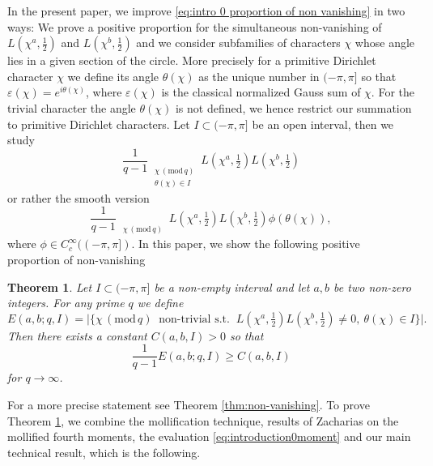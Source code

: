 \documentclass[12pt]{amsart}
\theoremstyle{plain}
\newtheorem{thm}{Theorem}[section]
\theoremstyle{definition}
\theoremstyle{remark}
\numberwithin{equation}{section}
\newcommand\sumst{\mathop{{\sum}^\ast}\limits}
\newcommand{\mods}[1]{\,(\mathrm{mod}\,{#1})}
\renewcommand{\geq}{\geqslant}
\begin{document}
In the present paper, we improve \eqref{eq:intro 0 proportion of non vanishing} in two ways: We prove a positive proportion for the simultaneous non-vanishing of $L(\chi^a,\tfrac{1}{2})$ and $L(\chi^b,\tfrac{1}{2})$ and we consider subfamilies of characters $\chi$ whose angle lies in a given section of the circle. More precisely for a primitive Dirichlet character $\chi$ we define its angle $\theta(\chi)$ as the unique number in $(-\pi,\pi]$ so that $\varepsilon(\chi) = e^{i\theta(\chi)}$, where $\varepsilon(\chi)$ is the classical normalized Gauss sum of $\chi$. For the trivial character the angle $\theta (\chi)$ is not defined, we hence restrict our summation to primitive Dirichlet characters. Let $I \subset (-\pi,\pi]$ be an open interval, then we study
\begin{equation*}
    \frac{1}{q-1}\sumst_{\substack{\chi \mods{q}\\ \theta(\chi) \in I}}L\left(\chi^a,\tfrac{1}{2}\right)L\left(\chi^b,\tfrac{1}{2}\right)
\end{equation*}
or rather the smooth version 
\begin{equation*}
    \frac{1}{q-1}\sumst_{\substack{\chi \mods{q}}}L\left(\chi^a,\tfrac 12\right)L\left(\chi^b,\tfrac 12\right)\phi(\theta(\chi)),
\end{equation*}
where $\phi \in C_c^{\infty}((-\pi,\pi]).$  
In this paper, we show the following positive proportion of non-vanishing 
\begin{thm}\label{thm:intro nonvanishing}Let $I \subset (-\pi,\pi]$ be a non-empty interval and let $a,b$ be two non-zero integers. For any prime $q$ we define
\[E(a,b;q,I)= \vert{ \{\chi  \mods q\ \text{ non-trivial s.t. } \  L(\chi^a,\tfrac 12)L(\chi^b,\tfrac 12)\neq  0,\  \theta(\chi) \in I  \}}\vert.\]
Then there exists a constant $C(a,b,I)>0$ so that
    \begin{equation}\label{eq:intrononvanishing}
   \frac{1}{q-1}E(a,b;q,I) \geq C(a,b,I) 
\end{equation}
for $q\to \infty$.
\end{thm}
For a more precise statement see Theorem \ref{thm:non-vanishing}. To prove Theorem \ref{thm:intro nonvanishing}, we combine the mollification technique, results of Zacharias \cite{Zacharias2016MollificationOT} on the mollified fourth moments, the evaluation \eqref{eq:introduction0moment} and our main technical result, which is the following.
\end{document}
